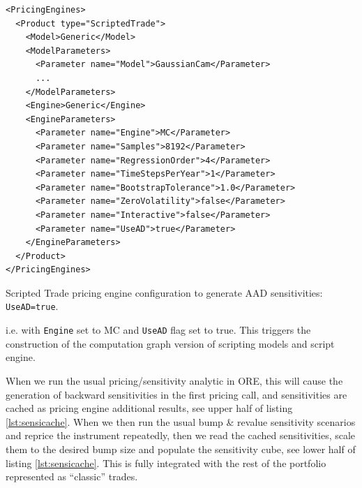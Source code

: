 \documentclass[12pt, a4paper]{report}
\begin{document}
\begin{listing}[hbt]
\begin{verbatim}
<PricingEngines>
  <Product type="ScriptedTrade">
    <Model>Generic</Model>
    <ModelParameters>
      <Parameter name="Model">GaussianCam</Parameter>
      ...
    </ModelParameters>
    <Engine>Generic</Engine>
    <EngineParameters>
      <Parameter name="Engine">MC</Parameter>
      <Parameter name="Samples">8192</Parameter>
      <Parameter name="RegressionOrder">4</Parameter>
      <Parameter name="TimeStepsPerYear">1</Parameter>
      <Parameter name="BootstrapTolerance">1.0</Parameter>
      <Parameter name="ZeroVolatility">false</Parameter>
      <Parameter name="Interactive">false</Parameter>
      <Parameter name="UseAD">true</Parameter>
    </EngineParameters>
  </Product>
</PricingEngines>
\end{verbatim}
\caption{Scripted Trade pricing engine configuration to generate AAD sensitivities: {\tt UseAD=true}.}
\label{lst:pricingengineconfig_aad}
\end{listing}

i.e. with {\tt Engine} set to MC and {\tt UseAD} flag set to true.
This triggers the construction of the computation graph version of scripting models and script engine.

When we run the usual pricing/sensitivity analytic in ORE, this will cause the generation of
backward sensitivities in the first pricing call, and sensitivities are cached as pricing
engine additional results, see upper half of listing \ref{lst:sensicache}.
When we then run the usual bump \& revalue sensitivity scenarios and
reprice the instrument repeatedly, then we read the cached sensitivities, scale them to the
desired bump size and populate the sensitivity cube, see lower half of listing \ref{lst:sensicache}.
This is fully integrated with the rest of the portfolio represented as ``classic'' trades.
\end{document}
